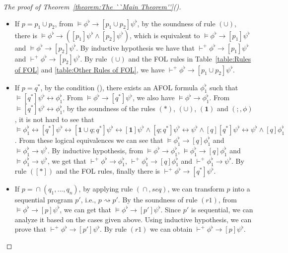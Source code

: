 \documentclass{fcs}
\newcommand{\rmn}[1]{(\romannumeral#1)}
\newcommand{\noth}[0]{\mathbf{1}}
\DeclareMathOperator{\seq}{;}
\DeclareMathOperator{\para}{\cap}
\newcommand{\red}[0]{\rightsquigarrow}
\newcommand{\reld}[0]{\mathit{\vdash^+}}
\begin{document}
\begin{proof}[The proof of Theorem~\ref{theorem:The ``Main Theorem''}\rmn{2}]
\begin{itemize}
    \item If $p=p_1\cup p_2$, from $\models \phi^\flat\to [p_1\cup p_2]\psi^\flat$, by the soundness of rule $(\cup)$, there is $\models \phi^\flat\to ([p_1]\psi^\flat\wedge [p_2]\psi^\flat)$, which is equivalent to
    $\models \phi^\flat\to [p_1]\psi^\flat$ and $\models \phi^\flat\to [p_2]\psi^\flat$.
    By inductive hypothesis we have that $\reld \phi^\flat\to [p_1]\psi^\flat$ and $\reld \phi^\flat\to [p_2]\psi^\flat$.
    By rule $(\cup)$ and the FOL rules in Table~\ref{table:Rules of FOL} and \ref{table:Other Rules of FOL}, we have $\reld \phi^\flat\to [p_1\cup p_2]\psi^\flat$.

    \item If $p=q^*$, by the condition \rmn{1}, there exists an AFOL formula $\phi^\flat_1$ such that $\models [q^*]\psi^\flat\leftrightarrow \phi^\flat_1$.
    From $\models \phi^\flat\to [q^*]\psi^\flat$, we also have $\models \phi^\flat \to \phi^\flat_1$.
    From $\models [q^*]\psi^\flat\leftrightarrow \phi^\flat_1$, by the soundness of the rules $(*)$, $(\cup)$, $(\noth)$ and $(\seq, \phi)$, it is not hard to see that
    $\models \phi^\flat_1\leftrightarrow [q^*]\psi^\flat\leftrightarrow [\noth\cup q\seq q^*]\psi^\flat \leftrightarrow [\noth]\psi^\flat\wedge [q\seq q^*]\psi^\flat \leftrightarrow \psi^\flat\wedge [q][q^*]\psi^\flat \leftrightarrow \psi^\flat\wedge [q]\phi^\flat_1$.
    From these logical equivalences we can see that $\models \phi^\flat_1\to [q]\phi^\flat_1$ and $\models\phi^\flat_1\to \psi^\flat$.
    By inductive hypothesis, from $\models \phi^\flat \to \phi^\flat_1$, $\models \phi^\flat_1\to [q]\phi^\flat_1$ and $\models\phi^\flat_1\to \psi^\flat$, we get that
    $\reld \phi^\flat \to \phi^\flat_1$, $\reld \phi^\flat_1\to [q]\phi^\flat_1$ and $\reld\phi^\flat_1\to \psi^\flat$.
    By rule $([*])$ and the FOL rules, finally there is $\reld \phi^\flat \to [q^*]\psi^\flat$.

    \item If $p=\para(q_1,...,q_n)$, by applying rule $(\para, \mathit{seq})$, we can transform $p$ into a sequential program $p'$, i.e., $p\red p'$.
    By the soundness of rule $(\mathit{r1})$, from $\models \phi^\flat\to [p]\psi^\flat$, we can get that $\models \phi^\flat\to [p']\psi^\flat$.
    Since $p'$ is sequential, we can analyze it based on the cases given above.
    Using inductive hypothesis, we can prove that $\reld \phi^\flat\to [p']\psi^\flat$.
    By rule $(\mathit{r1})$ we can obtain $\reld \phi^\flat\to [p]\psi^\flat$.
\end{itemize}


\end{proof}
\end{document}
